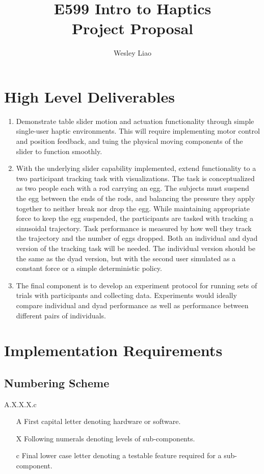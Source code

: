 \documentclass{article}
\title{E599 Intro to Haptics\\Project Proposal}
\author{Wesley Liao}
\begin{document}
\maketitle

\section{High Level Deliverables}
\begin{enumerate}
  \item Demonstrate table slider motion and actuation functionality through
    simple single-user haptic environments.
    This will require implementing motor control and position feedback, and
    tuing the physical moving components of the slider to function smoothly.

  \item With the underlying slider capability implemented, extend functionality
    to a two participant tracking task with visualizations.
    The task is conceptualized as two people each with a rod carrying an egg.
    The subjects must suspend the egg between the ends of the rods, and
    balancing the pressure they apply together to neither break nor drop the egg.
    While maintaining appropriate force to keep the egg suspended, the
    participants are tasked with tracking a sinusoidal trajectory. Task
    performance is measured by how well they track the trajectory and the number
    of eggs dropped.
    Both an individual and dyad version of the tracking task will be needed. The
    individual version should be the same as the dyad version, but with the
    second user simulated as a constant force or a simple deterministic policy.

  \item The final component is to develop an experiment protocol for running
    sets of trials with participants and collecting data. Experiments would
    ideally compare individual and dyad performance as well as performance
    between different pairs of individuals.
\end{enumerate}

\section{Implementation Requirements}
\subsection*{Numbering Scheme}
A.X.X.X.c
\begin{enumerate}
\item[A] First capital letter denoting hardware or software.
\item[X] Following numerals denoting levels of sub-components.
\item[c] Final lower case letter denoting a testable feature required for a sub-component.
\end{enumerate}
\end{document}
